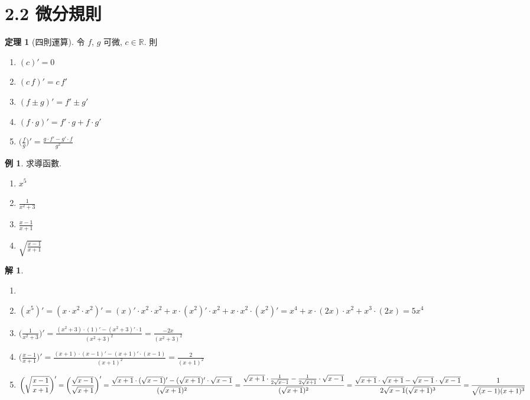 \documentclass[12pt]{extarticle}
\newcommand{\ds}{\displaystyle}
\theoremstyle{definition}
\newtheorem*{thm}{定理}
\newtheorem*{ex}{例}
\newtheorem*{sol}{解}
\begin{document}
\section*{2.2 微分規則}

\begin{thm}[四則運算] 令 $f$, $g$ 可微, $c\in\mathbb{R}$. 則
  \setlength{\columnsep}{-0mm}
  \begin{multicols}{3}
    \begin{enumerate}\setlength\itemsep{0em}
      \item $\ds (c)' = 0$
      \item $\ds (c\,f)' = c\,f'$
      \item $\ds (f\pm g)' = f'\!\pm g'$
      \item $\ds (f\cdot g)' = f'\!\cdot g + f\cdot g'$
      \item $\ds \Big(\frac{f}{g}\Big)' = \frac{g\cdot f' - g'\!\cdot f}{g^2}$
    \end{enumerate}
  \end{multicols}
\end{thm}

\begin{ex} 求導函數. 
  \begin{multicols}{4}
    \begin{enumerate}\setlength\itemsep{0em}
      \item $x^5$
      \item $\frac{1}{x^2 + 3}$
      \item $\frac{x - 1}{x + 1}$
      \item $\sqrt{\frac{x - 1}{x + 1}}$
    \end{enumerate}
  \end{multicols}
\end{ex}

\begin{sol}
  \begin{enumerate}\setlength\itemsep{0em}
    \item[]
    \item $\ds (x^5)' = (x \cdot x^2 \cdot x^2)' = (x)'\cdot x^2 \cdot x^2 + x\cdot(x^2)'\cdot x^2 + x\cdot x^2\cdot(x^2)' = x^4 + x\cdot(2x)\cdot x^2 + x^3\cdot(2x) = 5 x^4$
    \item $\ds\Big(\frac{1}{x^2 + 3}\Big)' = \frac{(x^2 + 3)\cdot(1)' - (x^2 + 3)'\cdot 1}{(x^2 + 3)^2} = \frac{-2x}{(x^2 + 3)^2}$
    \item $\ds\Big(\frac{x - 1}{x + 1}\Big)' = \frac{(x + 1)\cdot(x - 1)' - (x + 1)'\cdot(x - 1)}{(x + 1)^2} = \frac{2}{(x + 1)^2}$ 
    \item $\ds\bigg(\sqrt{\frac{x - 1}{x + 1}}\bigg)' = \bigg(\frac{\sqrt{x - 1}}{\sqrt{x + 1}}\bigg)' = \frac{\sqrt{x + 1}\cdot(\sqrt{x - 1})' - (\sqrt{x + 1})'\cdot\sqrt{x - 1}}{(\sqrt{x + 1})^2} \\= \frac{\sqrt{x + 1}\cdot\frac{1}{2\sqrt{x - 1}} - \frac{1}{2\sqrt{x + 1}}\cdot\sqrt{x - 1}}{(\sqrt{x + 1})^2} = \frac{\sqrt{x + 1}\cdot\sqrt{x + 1} - \sqrt{x - 1}\cdot\sqrt{x - 1}}{2\sqrt{x - 1}(\sqrt{x + 1})^3} = \frac{1}{\sqrt{(x - 1)(x + 1)^3}}$ %
  \end{enumerate}
\end{sol}
\end{document}
